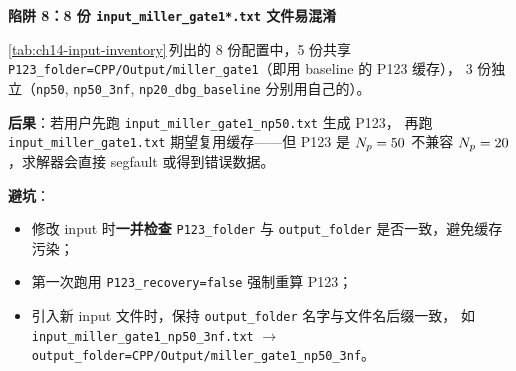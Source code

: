 \begin{pitfallbox}[label={box:ch14-pitfall-input-file-proliferation}]
\textbf{陷阱 8：8 份 \texttt{input\_miller\_gate1*.txt} 文件易混淆}

\cref{tab:ch14-input-inventory}\(\,\)列出的 8 份配置中，5 份共享
\texttt{P123\_folder=CPP/Output/miller\_gate1}（即用 baseline 的 P123 缓存），
3 份独立（\texttt{np50}, \texttt{np50\_3nf}, \texttt{np20\_dbg\_baseline}
分别用自己的）。

\textbf{后果}：若用户先跑 \texttt{input\_miller\_gate1\_np50.txt} 生成 P123，
再跑 \texttt{input\_miller\_gate1.txt} 期望复用缓存——但 P123 是 \(N_p = 50\)
不兼容 \(N_p = 20\)，求解器会直接 segfault 或得到错误数据。

\textbf{避坑}：
\begin{itemize}
  \item 修改 input 时\textbf{一并检查} \texttt{P123\_folder} 与 \texttt{output\_folder}
        是否一致，避免缓存污染；
  \item 第一次跑用 \texttt{P123\_recovery=false} 强制重算 P123；
  \item 引入新 input 文件时，保持 \texttt{output\_folder} 名字与文件名后缀一致，
        如 \texttt{input\_miller\_gate1\_np50\_3nf.txt} \(\to\)
        \texttt{output\_folder=CPP/Output/miller\_gate1\_np50\_3nf}。
\end{itemize}
\end{pitfallbox}

